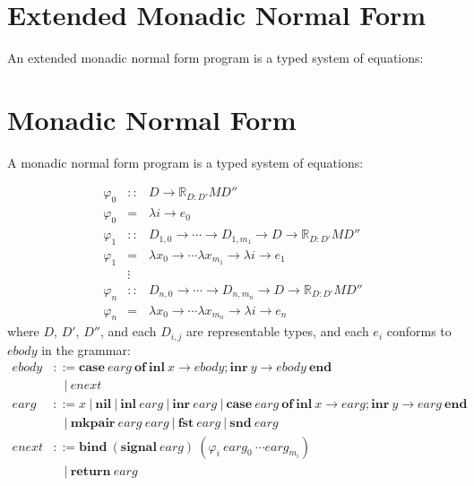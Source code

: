 \documentclass{article}[11pt]
\begin{document}
\section{Extended Monadic Normal Form}
An extended monadic normal form program is a typed system of equations:

\section{Monadic Normal Form}
A monadic normal form program is a typed system of equations:

\begin{eqnarray*}
\varphi_0 &::& D \rightarrow \mathbb{R}_{D:D'} M D''\\
\varphi_0 &=& \lambda i \rightarrow e_0\\
\varphi_1 &::& D_{1,0} \rightarrow \cdots \rightarrow D_{1,m_1} \rightarrow D \rightarrow \mathbb{R}_{D:D'} M D''\\
\varphi_1 &=& \lambda x_0 \rightarrow \cdots \lambda x_{m_1} \rightarrow \lambda i \rightarrow e_1\\
          &\vdots&\\
\varphi_n &::& D_{n,0} \rightarrow \cdots \rightarrow D_{n,m_n} \rightarrow D \rightarrow \mathbb{R}_{D:D'} M D''\\
\varphi_n &=& \lambda x_0 \rightarrow \cdots \lambda x_{m_n} \rightarrow \lambda i \rightarrow e_n
\end{eqnarray*}
%
where $D$, $D'$, $D''$, and each $D_{i,j}$ are representable types, and each $e_i$ conforms to $\mathit{ebody}$ in the grammar:
%
$$
\begin{aligned}
\mathit{ebody} &::= \mathbf{case}~ \mathit{earg}~ \mathbf{of}~ \mathbf{inl}~ x \rightarrow \mathit{ebody} ; \mathbf{inr}~ y \rightarrow \mathit{ebody}~ \mathbf{end}\\
               &~~~~|~ \mathit{enext}\\
\mathit{earg}  &::= \mathit{x}~ |~ \mathbf{nil}~ |~ \mathbf{inl}~ \mathit{earg}~ |~ \mathbf{inr}~ \mathit{earg}~ |~ \mathbf{case}~ \mathit{earg}~ \mathbf{of}~ \mathbf{inl}~ x \rightarrow \mathit{earg} ; \mathbf{inr}~ y \rightarrow \mathit{earg}~ \mathbf{end}\\
               &~~~~|~ \mathbf{mkpair}~ \mathit{earg}~ \mathit{earg}~ |~ \mathbf{fst}~ \mathit{earg}~ |~ \mathbf{snd}~ \mathit{earg}\\
\mathit{enext} &::= \mathbf{bind}~ (\mathbf{signal}~ \mathit{earg})~ (\varphi_i~ \mathit{earg}_0~ \cdots \mathit{earg}_{m_i})\\
               &~~~~|~ \mathbf{return}~ \mathit{earg}
\end{aligned}
$$
\end{document}
